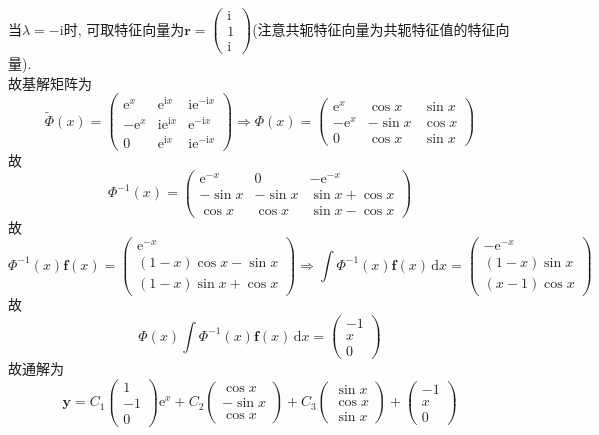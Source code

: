 \documentclass[titlepage,11pt,a4paper,twoside]{report}
\makeatletter
\newcommand\diff{\,\mathrm{d}}
\newcommand\e{\mathrm{e}}
\newcommand\ii{\mathrm{i}}
\newcommand\bmitPhi{\bm{\varPhi}}
\newenvironment{solve}{\par
	\pushQED{\qed}%
	\normalfont \topsep1\p@\@plus6\p@\relax
	\trivlist
	\item\relax
	{\hspace*{\parindent}{\heiti 解}\@addpunct{:}}\hspace\labelsep\ignorespaces
}{%
	\popQED\endtrivlist\@endpefalse
}
\makeatother
\begin{document}
\begin{solve}
当$\lambda=-\ii$时, 可取特征向量为$\bm{r}=\begin{pmatrix}\ii\\1\\\ii\end{pmatrix}$(注意共轭特征向量为共轭特征值的特征向量).\\
故基解矩阵为
\[\widetilde{\bmitPhi}(x)=\begin{pmatrix}\e^x&\e^{\ii x}&\ii\e^{-\ii x}\\-\e^x&\ii\e^{\ii x}&\e^{-\ii x}\\0&\e^{\ii x}&\ii\e^{-\ii x}\end{pmatrix}\Rightarrow\bmitPhi(x)=\begin{pmatrix}\e^x&\cos x&\sin x\\-\e^x&-\sin x&\cos x\\0&\cos x&\sin x\end{pmatrix}\]
故\[\bmitPhi^{-1}(x)=\begin{pmatrix}\e^{-x}&0&-\e^{-x}\\-\sin x&-\sin x&\sin x+\cos x\\\cos x&\cos x&\sin x-\cos x\end{pmatrix}\]
故\[\bmitPhi^{-1}(x)\bm{f}(x)=\begin{pmatrix}\e^{-x}\\(1-x)\cos x-\sin x\\(1-x)\sin x+\cos x\end{pmatrix}\Rightarrow\int\bmitPhi^{-1}(x)\bm{f}(x)\diff x=\begin{pmatrix}-\e^{-x}\\(1-x)\sin x\\(x-1)\cos x\end{pmatrix}\]
故\[\bmitPhi(x)\int\bmitPhi^{-1}(x)\bm{f}(x)\diff x=\begin{pmatrix}-1\\x\\0\end{pmatrix}\]
故通解为\[\bm{y}=C_1\begin{pmatrix}1\\-1\\0\end{pmatrix}\e^x+C_2\begin{pmatrix}\cos x\\-\sin x\\\cos x\end{pmatrix}+C_3\begin{pmatrix}\sin x\\\cos x\\\sin x\end{pmatrix}+\begin{pmatrix}-1\\x\\0\end{pmatrix}\]

\end{solve}
\end{document}
